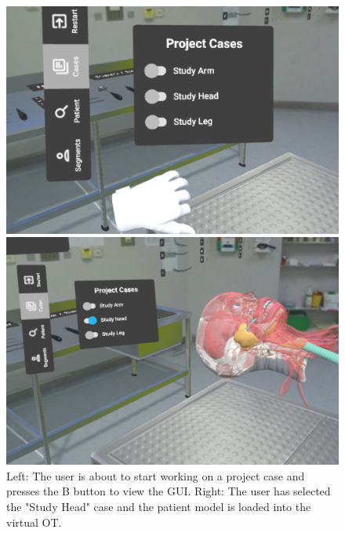 \begin{figure}[ht]
  \centering
  \begin{minipage}{.5\textwidth}
    \centering
    \includegraphics[width=0.99\linewidth]{images/implementation/user_interface/project_case_pre_load.png}
  \end{minipage}%
  \begin{minipage}{.5\textwidth}
    \centering
    \includegraphics[width=0.99\linewidth]{images/implementation/user_interface/project_case_loaded.png}
  \end{minipage}
  \caption{\label{fig::LoadingProjectCase} Left: The user is about to start working on a project case and presses the B button to view the GUI. Right: The user has selected the "Study Head" case and the patient model is loaded into the virtual OT.}
\end{figure}

